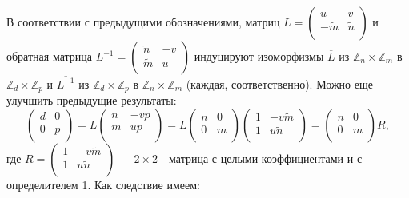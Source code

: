 \documentclass{mai_book}
\begin{document}
\begin{sled}
В соответствии с предыдущими обозначениями, матриц \linebreak $L = {\left( \begin{array}{ccc}
u & v \\
-\tilde{m} & \tilde{n} \\
\end{array} \right)}$ и обратная матрица $L^{-1} = {\left( \begin{array}{ccc}
\tilde{n} & -v \\
\tilde{m} & u \\
\end{array} \right)}$ индуцируют \linebreak изоморфизмы $\overline{L}$ из $\mathbb{Z}_n \times \mathbb{Z}_m$ в $\mathbb{Z}_d \times \mathbb{Z}_p$ и $\overline{L^{-1}}$ из $\mathbb{Z}_d \times\mathbb{Z}_p$ в $\mathbb{Z}_n \times \mathbb{Z}_m$ \linebreak (каждая, соответственно). 
Можно еще улучшить предыдущие результаты:  
$${\left( \begin{array}{ccc}
d & 0 \\
0 & p \\
\end{array} \right)} = L {\left( \begin{array}{ccc}
n & -vp \\
m & up \\
\end{array} \right)} = L {\left( \begin{array}{ccc}
n & 0 \\
0 & m \\
\end{array} \right)}{\left( \begin{array}{ccc}
1 & -v\tilde{m} \\
1 & u\tilde{n} \\
\end{array} \right)} = {\left( \begin{array}{ccc}
n & 0 \\
0 & m \\
\end{array} \right)}R,$$
где  $R = {\left( \begin{array}{ccc}
1 & -v\tilde{m} \\
1 & u\tilde{n} \\
\end{array} \right)}$ --- $2 \times 2$ - матрица с целыми коэффициентами и с \linebreak определителем 1. Как следствие имеем: 
\end{sled}
\end{document}
